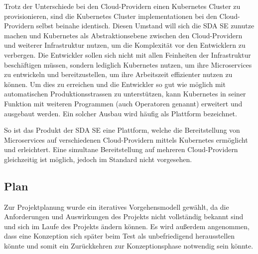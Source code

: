 Trotz der Unterschiede bei den Cloud-Providern einen Kubernetes Cluster zu provisionieren, sind die Kubernetes Cluster implementationen bei den Cloud-Providern selbst beinahe identisch.
Diesen Umstand will sich die SDA SE zunutze machen und Kubernetes als Abstraktionsebene zwischen den Cloud-Providern und weiterer Infrastruktur nutzen, um die Komplexität vor den Entwicklern zu verbergen.
Die Entwickler sollen sich nicht mit allen Feinheiten der Infrastruktur beschäftigen müssen, sondern lediglich Kubernetes nutzen, um ihre Microservices zu entwickeln und bereitzustellen, um ihre Arbeitszeit effizienter nutzen zu können.
Um dies zu erreichen und die Entwickler so gut wie möglich mit automatischen Produktionsstrassen zu unterstützen, kann Kubernetes in seiner Funktion mit weiteren Programmen (auch Operatoren genannt) erweitert und ausgebaut werden.
Ein solcher Ausbau wird häufig als Plattform bezeichnet.
\medskip

So ist das Produkt der SDA SE eine Plattform, welche die Bereitstellung von Microservices auf verschiedenen Cloud-Providern mittels Kubernetes ermöglicht und erleichtert.
Eine simultane Bereitstellung auf mehreren Cloud-Providern gleichzeitig ist möglich, jedoch im Standard nicht vorgesehen.

\subsection{Plan}
\label{subsec:description:plan}

Zur Projektplanung wurde ein iteratives Vorgehensmodell gewählt, da die Anforderungen und Auswirkungen des Projekts nicht vollständig bekannt sind und sich im Laufe des Projekts ändern können.
Es wird außerdem angenommen, dass eine Konzeption sich später beim Test als unbefriedigend herausstellen könnte und somit ein Zurückkehren zur Konzeptionsphase notwendig sein könnte.
\medskip

